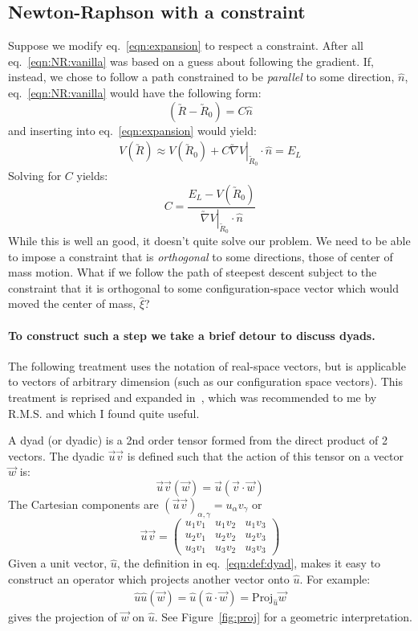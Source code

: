 \documentclass[letter,11pt]{article}
\newcommand{\cvec}[1]{\utilde{#1}}
\newcommand{\svec}[1]{\vec{#1}}
\newcommand{\laeq}[1]{\label{eqn:#1}}
\newcommand{\refeq}[1]{eq.~\ref{eqn:#1}}
\begin{document}
\subsection{Newton-Raphson with a constraint}
Suppose we modify \refeq{expansion} to respect a constraint. After all \refeq{NR:vanilla} was based on a guess about following the gradient. If, instead, we chose to follow a path constrained to be \emph{parallel} to some direction, $\hat{n}$, \refeq{NR:vanilla} would have the following form:
\begin{equation}\laeq{NR:parallel}
  (\cvec{R} - \cvec{R}_0) = C \hat{n}
\end{equation}
and inserting into \refeq{expansion} would yield:
\begin{align}
  V(\cvec{R}) \approx  V(\cvec{R}_0) + C \left. \cvec{\nabla}V\right|_{\cvec{R}_0} \cdot \hat{n} = E_L
\end{align}
Solving for $C$ yields:
\[
  C = \frac{E_L - V(\cvec{R}_0)}{\left. \cvec{\nabla} V\right|_{\cvec{R}_0} \cdot \hat{n}}
\]
While this is well an good, it doesn't quite solve our problem. We need to be able to impose a constraint that is \emph{orthogonal} to some directions, those of center of mass motion. What if we follow the path of steepest descent subject to the constraint that it is orthogonal to some configuration-space vector which would moved the center of mass, $\hat{\xi}$?

\paragraph{To construct such a step we take a brief detour to discuss dyads.} The following treatment uses the notation of real-space vectors, but is applicable to vectors of arbitrary dimension (such as our configuration space vectors). This treatment is reprised and expanded in~\cite{simmonds:1982}, which was recommended to me by R.M.S. and which I found quite useful.

A dyad (or dyadic) is a 2nd order tensor formed from the direct product of 2 vectors. The dyadic $\svec{u}\svec{v}$ is defined such that the action of this tensor on a vector $\svec{w}$ is:
\begin{equation}\laeq{def:dyad}
  \svec{u}\svec{v} (\svec{w}) = \svec{u}(\svec{v} \cdot \svec{w})
\end{equation}
The Cartesian components are ${(\svec{u}\svec{v})}_{\alpha, \gamma} = u_{\alpha}v_{\gamma} $ or
\[
  \svec{u}\svec{v} = 
  \begin{pmatrix}
    u_1 v_1 & u_1 v_2 & u_1 v_3 \\
    u_2 v_1 & u_2 v_2 & u_2 v_3 \\
    u_3 v_1 & u_3 v_2 & u_3 v_3
  \end{pmatrix}
\]
Given a unit vector, $\hat{u}$, the definition in \refeq{def:dyad}, makes it easy to construct an operator which projects another vector onto $\hat{u}$. For example:
\begin{align}
  \hat{u}\hat{u}(\svec{w}) = \hat{u} (\hat{u} \cdot \svec{w}) = {\textrm{Proj}}_{\hat{u}} \svec{w}
\end{align}
gives the projection of $\svec{w}$ on $\hat{u}$. See Figure~\ref{fig:proj} for a geometric interpretation.
\end{document}
